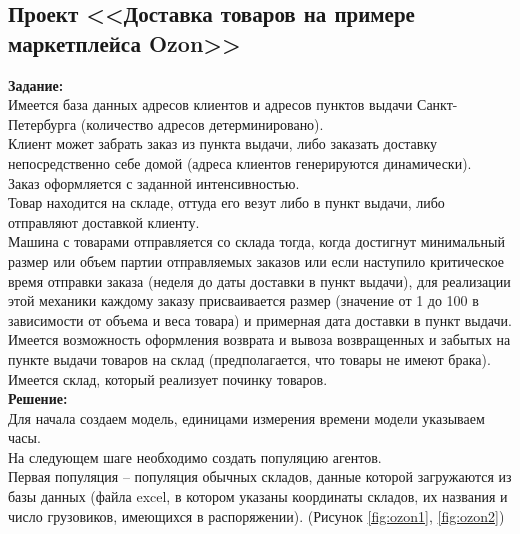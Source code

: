 \subsection*{Проект <<Доставка товаров на примере маркетплейса Ozon>>}

\textbf{Задание:}\\
Имеется база данных адресов клиентов и адресов пунктов выдачи Санкт-Петербурга (количество адресов детерминировано).\\ 

Клиент может забрать заказ из пункта выдачи, либо заказать доставку непосредственно себе домой (адреса клиентов генерируются динамически).\\

Заказ оформляется с заданной интенсивностью.\\

Товар находится на складе, оттуда его везут либо в пункт выдачи, либо отправляют доставкой клиенту.\\

Машина с товарами отправляется со склада тогда, когда достигнут минимальный размер или объем партии отправляемых заказов или если наступило критическое время отправки заказа (неделя до даты доставки в пункт выдачи), для реализации этой механики каждому заказу присваивается размер (значение от 1 до 100 в зависимости от объема и веса товара) и примерная дата доставки в пункт выдачи.\\

Имеется возможность оформления возврата и вывоза возвращенных и забытых на пункте выдачи товаров на склад (предполагается, что товары не имеют брака).\\

Имеется склад, который реализует починку товаров.\\

\textbf{Решение:}\\
Для начала создаем модель, единицами измерения времени модели указываем часы.\\

На следующем шаге необходимо создать популяцию агентов.\\

Первая популяция – популяция обычных складов, данные которой загружаются из базы данных (файла excel, в котором указаны координаты складов, их названия и число грузовиков, имеющихся в распоряжении). (Рисунок \ref{fig:ozon1}, \ref{fig:ozon2})

